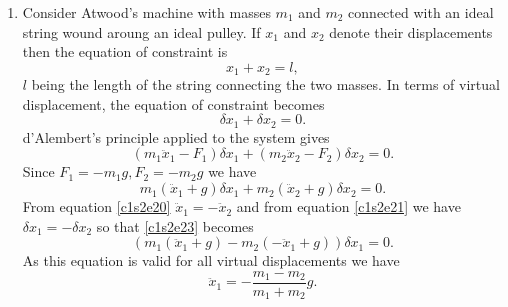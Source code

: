 \begin{enumerate}
\item Consider Atwood's machine with masses $m_1$ and $m_2$ connected with
an ideal string wound aroung an ideal pulley. If $x_1$ and $x_2$ denote their
displacements then the equation of constraint is
\begin{equation}\label{c1s2e20}
x_1 + x_2 = l,
\end{equation}
$l$ being the length of the string connecting the two masses. In terms of
virtual displacement, the equation of constraint becomes
\begin{equation}\label{c1s2e21}
\delta x_1 + \delta x_2 = 0.
\end{equation}
d'Alembert's principle applied to the system gives
\begin{equation}\label{c1s2e22}
(m_1\ddot{x}_1 - F_1)\delta x_1 + (m_2\ddot{x}_2 - F_2)\delta x_2
= 0.
\end{equation}
Since $F_1 = -m_1g, F_2 = -m_2g$ we have
\begin{equation}\label{c1s2e23}
m_1(\ddot{x}_1 + g)\delta x_1 + m_2(\ddot{x}_2 + g)\delta x_2 = 0.
\end{equation}
From equation \eqref{c1s2e20} $\ddot{x}_1 = -\ddot{x}_2$ and from equation
\eqref{c1s2e21} we have $\delta x_1 = -\delta x_2$ so that \eqref{c1s2e23}
becomes
\begin{equation}
\left(m_1(\ddot{x}_1 + g) - m_2(-\ddot{x}_1 + g)\right)\delta x_1 = 0.
\end{equation}
As this equation is valid for all virtual displacements we have
\begin{equation}\label{c1s2e25}
\ddot{x}_1 = -\frac{m_1 - m_2}{m_1 + m_2}g.
\end{equation}


\end{enumerate}
